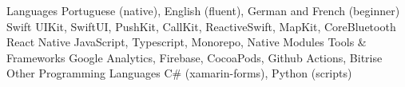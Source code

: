 \begin{cvskills}
  \cvskill
    {Languages}
    {Portuguese (native), English (fluent), German and French (beginner)}
  \cvskill
    {Swift}
    {UIKit, SwiftUI, PushKit, CallKit, ReactiveSwift, MapKit, CoreBluetooth}
    \cvskill
    {React Native}
    {JavaScript, Typescript, Monorepo, Native Modules}
   \cvskill
    {Tools \& Frameworks}
    {Google Analytics, Firebase, CocoaPods, Github Actions, Bitrise}
   \cvskill
     {Other Programming Languages}
     {C\# (xamarin-forms), Python (scripts) }
\end{cvskills}
